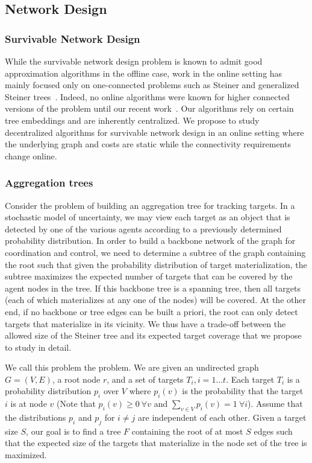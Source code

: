 \subsection{Network Design}
\subsubsection{Survivable Network Design}  
While the survivable network design problem is known to admit good
approximation algorithms in the offline case, work in the online
setting has mainly focused only on one-connected problems such as
Steiner and generalized Steiner trees~\cite{qw11}. Indeed, no online
algorithms were known for higher connected versions of the problem
until our recent work~\cite{gkr10}. Our algorithms rely on certain
tree embeddings and are inherently centralized.  We propose to study
decentralized algorithms for survivable network design in an online
setting where the underlying graph and costs are static while the
connectivity requirements change online.

\subsubsection{Aggregation trees} 
Consider the problem of building an aggregation tree for tracking
targets.  In a stochastic model of uncertainty, we may view each
target as an object that is detected by one of the various agents
according to a previously determined probability distribution.  In
order to build a backbone network of the graph for coordination and
control, we need to determine a subtree of the graph containing the
root such that given the probability distribution of target
materialization, the subtree maximizes the expected number of targets
that can be covered by the agent nodes in the tree. If this backbone
tree is a spanning tree, then all targets (each of which materializes
at any one of the nodes) will be covered. At the other end, if no
backbone or tree edges can be built a priori, the root can only detect
targets that materialize in its vicinity. We thus have a trade-off
between the allowed size of the Steiner tree and its expected target
coverage that we propose to study in detail.

We call this problem the  problem.  We are given an undirected graph $G =
(V,E)$, a root node $r$, and a set of targets $T_i, i = 1 \ldots
t$. Each target $T_i$ is a probability distribution $p_i$ over $V$
where $p_i(v)$ is the probability that the target $i$ is at node $v$
(Note that $p_i(v) \geq 0 \ \forall v$ and $\sum_{v \in V} p_i(v) = 1
\ \forall i$). Assume that the distributions $p_i$ and $p_j$ for $i
\neq j$ are independent of each other. Given a target size $S$, our
goal is to find a tree $F$ containing the root of at most $S$ edges
such that the expected size of the targets that materialize in the
node set of the tree is maximized.

